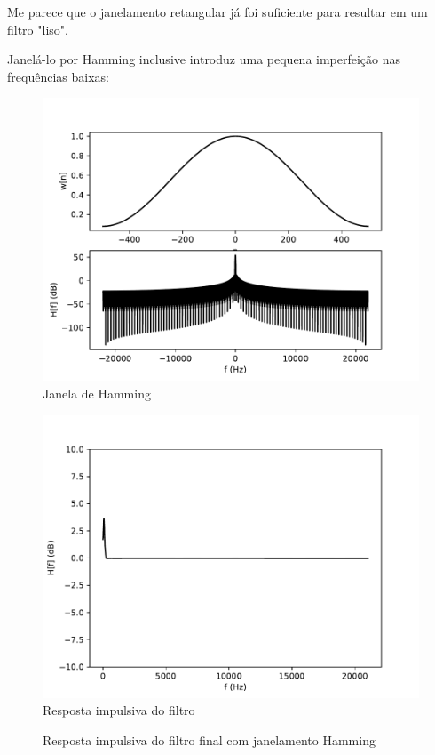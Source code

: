 \begin{multicols}{2}
Me parece que o janelamento retangular já foi suficiente para resultar em um filtro "liso". 

Janelá-lo por Hamming inclusive introduz uma pequena imperfeição nas frequências baixas:
\begin{figure}[H]
    \centering
    \begin{multicols}{2}
        \includegraphics[scale=0.25]{fig/window.pdf}\\
        \small{Janela de Hamming}
        
        \columnbreak
        
        \includegraphics[scale=0.25]{fig/windowed.pdf}\\
        \small{Resposta impulsiva do filtro}
        
    \end{multicols}
    \caption{Resposta impulsiva do filtro final com janelamento Hamming}
    \label{fig:impulsiva window 1000}
\end{figure}
\end{multicols}

